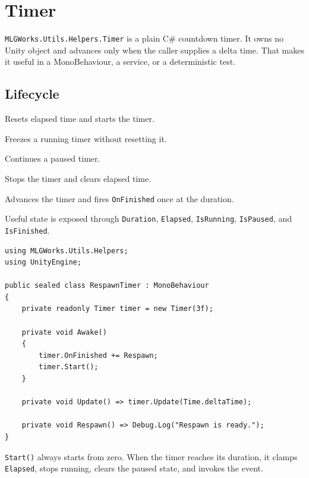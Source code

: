 \section{Timer}
\label{sec:timer}

\texttt{MLGWorks.Utils.Helpers.Timer} is a plain C\# countdown timer. It owns no Unity object and advances only when the caller supplies a delta time. That makes it useful in a MonoBehaviour, a service, or a deterministic test.

\subsection{Lifecycle}
\begin{description}[leftmargin=2.8cm,style=sameline]
  \item[\texttt{Start()}] Resets elapsed time and starts the timer.
  \item[\texttt{Pause()}] Freezes a running timer without resetting it.
  \item[\texttt{Resume()}] Continues a paused timer.
  \item[\texttt{Reset()}] Stops the timer and clears elapsed time.
  \item[\texttt{Update(float)}] Advances the timer and fires \texttt{OnFinished} once at the duration.
\end{description}

Useful state is exposed through \texttt{Duration}, \texttt{Elapsed}, \texttt{IsRunning}, \texttt{IsPaused}, and \texttt{IsFinished}.

\begin{lstlisting}
using MLGWorks.Utils.Helpers;
using UnityEngine;

public sealed class RespawnTimer : MonoBehaviour
{
    private readonly Timer timer = new Timer(3f);

    private void Awake()
    {
        timer.OnFinished += Respawn;
        timer.Start();
    }

    private void Update() => timer.Update(Time.deltaTime);

    private void Respawn() => Debug.Log("Respawn is ready.");
}
\end{lstlisting}

\texttt{Start()} always starts from zero. When the timer reaches its duration, it clamps \texttt{Elapsed}, stops running, clears the paused state, and invokes the event.

